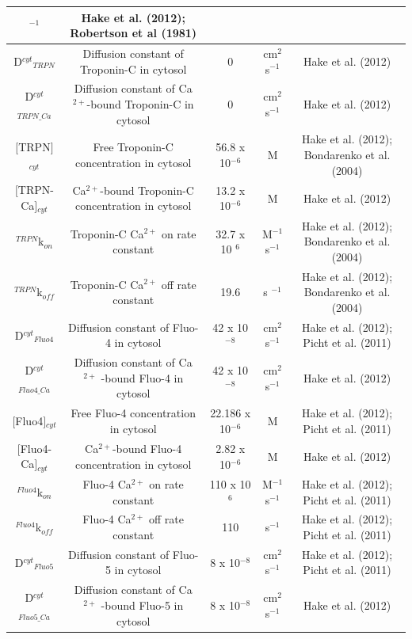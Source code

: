 \documentclass[12pt]{ucsddissertation}
\begin{document}
\begin{table}[h]
{\begin{tabular}{ccccc}
$^{-1}$ & Hake et al. (2012); Robertson et al (1981) \\
\hline
D$^{cyt}$$_{TRPN}$ & Diffusion constant of Troponin-C in cytosol & 
0 & cm$^{2}$s$^{-1}$ & Hake et al. (2012) \\
\hline
D$^{cyt}$$_{TRPN\_Ca}$ & Diffusion constant of Ca$^{2+}$-bound 
Troponin-C in cytosol & 0 & cm$^{2}$s$^{-1}$ & Hake et al. (2012) 
\\
\hline
$[$TRPN$]$$_{cyt}$ & Free Troponin-C concentration in cytosol & 56.8 
x 10$^{-6}$ & M & Hake et al. (2012); Bondarenko et al. (2004) \\
\hline
$[$TRPN-Ca$]$$_{cyt}$ & Ca$^{2+}$-bound Troponin-C concentration 
in cytosol & 13.2 x 10$^{-6}$ & M & Hake et al. (2012) \\
\hline
$^{TRPN}$k$_{on}$ & Troponin-C Ca$^{2+}$ on rate constant & 32.7 x 10
$^{6}$ & M$^{-1}$s$^{-1}$ & Hake et al. (2012); Bondarenko et 
al. (2004) \\
\hline
$^{TRPN}$k$_{off}$ & Troponin-C Ca$^{2+}$ off rate constant & 19.6 & s
$^{-1}$ & Hake et al. (2012); Bondarenko et al. (2004) \\
\hline
D$^{cyt}$$_{Fluo4}$ & Diffusion constant of Fluo-4 in cytosol & 42 
x 10$^{-8}$ & cm$^{2}$s$^{-1}$ & Hake et al. (2012); Picht et 
al. (2011) \\
\hline
D$^{cyt}$$_{Fluo4\_Ca}$ & Diffusion constant of Ca$^{2+}$
-bound Fluo-4 in cytosol & 42 x 10$^{-8}$ & cm$^{2}$s$^{-1}$ & 
Hake et al. (2012) \\
\hline
$[$Fluo4$]$$_{cyt}$ & Free Fluo-4 concentration in cytosol & 22.186 x 
10$^{-6}$ & M & Hake et al. (2012); Picht et al. (2011) \\
\hline
$[$Fluo4-Ca$]$$_{cyt}$ & Ca$^{2+}$-bound Fluo-4 concentration in 
cytosol & 2.82 x 10$^{-6}$ & M & Hake et al. (2012) \\
\hline
$^{Fluo4}$k$_{on}$ & Fluo-4 Ca$^{2+}$ on rate constant & 110 x 10$^{6
}$ & M$^{-1}$s$^{-1}$ & Hake et al. (2012); Picht et al. (2011) 
\\
\hline
$^{Fluo4}$k$_{off}$ & Fluo-4 Ca$^{2+}$ off rate constant & 110 & s$^{
-1}$ & Hake et al. (2012); Picht et al. (2011) \\
\hline
D$^{cyt}$$_{Fluo5}$ & Diffusion constant of Fluo-5 in cytosol & 8 
x 10$^{-8}$ & cm$^{2}$s$^{-1}$ & Hake et al. (2012); Picht et 
al. (2011) \\
\hline
D$^{cyt}$$_{Fluo5\_Ca}$ & Diffusion constant of Ca$^{2+}$
-bound Fluo-5 in cytosol & 8 x 10$^{-8}$ & cm$^{2}$s$^{-1}$ & 
Hake et al. (2012) \\

\end{tabular}}
\end{table}
\end{document}
